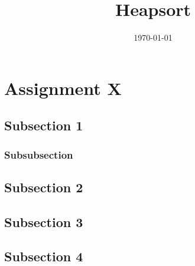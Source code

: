 \documentclass[a4paper,10pt]{article}
\title{Heapsort}
\author{}
\date{\today}
\begin{document}
\maketitle
\pagebreak
\tableofcontents
\pagebreak

\section{Assignment X}

\subsection{Subsection 1}

\subsubsection{Subsubsection}


\subsection{Subsection 2}



\subsection{Subsection 3}



\subsection{Subsection 4}
\end{document}
